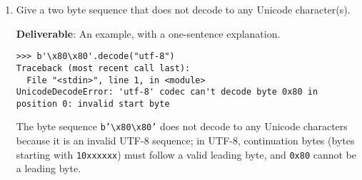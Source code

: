 \documentclass{article}
\begin{document}
\begin{enumerate}[label=(\alph*)]
\begin{answer}
    \begin{lstlisting}
>>> "hello".encode("utf-8")
b'hello'
>>> "hello".encode("utf-8").decode("utf-8")
'hello'
>>> decode_utf8_bytes_to_str_wrong("hello".encode("utf-8"))
'hello'
>>> "é".encode("utf-8")
b'\xc3\xa9'
>>> "é".encode("utf-8").decode("utf-8")
'é' 
>>> decode_utf8_bytes_to_str_wrong("é".encode("utf-8"))
Traceback (most recent call last):
  File "<stdin>", line 1, in <module>
  File "<stdin>", line 2, in decode_utf8_bytes_to_str_wrong
UnicodeDecodeError: 'utf-8' codec can't decode byte 0xc3 in position 0: unexpected end of data
    \end{lstlisting}
    \end{answer}
    
    \item {Give a two byte sequence that does not decode to any Unicode character(s).}
    
    {\textbf{Deliverable}: An example, with a one-sentence explanation.}
    
    \begin{answer}
    \begin{lstlisting}
>>> b'\x80\x80'.decode("utf-8") 
Traceback (most recent call last):
  File "<stdin>", line 1, in <module>
UnicodeDecodeError: 'utf-8' codec can't decode byte 0x80 in position 0: invalid start byte
    \end{lstlisting}

    The byte sequence \texttt{b'\textbackslash x80\textbackslash x80'} does not decode to any Unicode characters because it is an invalid UTF-8 sequence; in UTF-8, continuation bytes (bytes starting with \texttt{10xxxxxx}) must follow a valid leading byte, and \texttt{0x80} cannot be a leading byte.
    \end{answer}
\end{enumerate}
\end{document}
